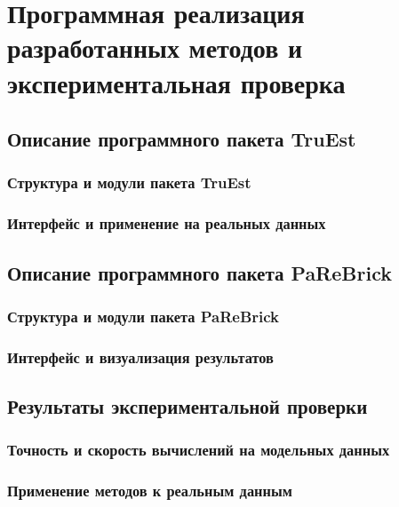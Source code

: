 \chapter{Программная реализация разработанных методов и экспериментальная проверка}
\label{chap:software_implementation}

\section{Описание программного пакета TruEst}
\label{sec:truest_package}

\subsection{Структура и модули пакета TruEst}
\label{subsec:truest_structure}

\subsection{Интерфейс и применение на реальных данных}
\label{subsec:truest_application}

\section{Описание программного пакета PaReBrick}
\label{sec:parebrick_package}

\subsection{Структура и модули пакета PaReBrick}
\label{subsec:parebrick_structure}

\subsection{Интерфейс и визуализация результатов}
\label{subsec:parebrick_application}

\section{Результаты экспериментальной проверки}
\label{sec:experimental_validation}

\subsection{Точность и скорость вычислений на модельных данных}
\label{subsec:benchmark_simulated}

\subsection{Применение методов к реальным данным}
\label{subsec:benchmark_realdata}
